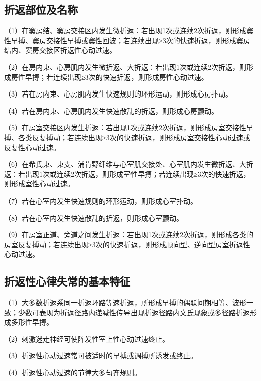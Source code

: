 \protect\hypertarget{text00021.htmlux5cux23subid227}{}{}

\subsection{折返部位及名称}

（1）在窦房结、窦房交接区内发生微折返：若出现1次或连续2次折返，则形成窦性早搏、窦房交接性早搏或窦性回波；若连续出现≥3次的快速折返，则形成窦房结内、窦房交接区折返性心动过速。

（2）在房内束、心房肌内发生微折返、大折返：若出现1次或连续2次折返，则形成房性早搏；若连续出现≥3次的快速折返，则形成房性心动过速。

（3）若在房内束、心房肌内发生快速规则的环形运动，则形成心房扑动。

（4）若在房内束、心房肌内发生快速散乱的折返，则形成心房颤动。

（5）在房室交接区内发生折返：若出现1次或连续2次折返，则形成房室交接性早搏、各类反复搏动；若连续出现≥3次的快速折返，则形成房室交接性心动过速或反复性心动过速。

（6）在希氏束、束支、浦肯野纤维与心室肌交接处、心室肌内发生微折返、大折返：若出现1次或连续2次折返，则形成室性早搏；若连续出现≥3次的快速折返，则形成室性心动过速。

（7）若在心室内发生快速规则的环形运动，则形成心室扑动。

（8）若在心室内发生快速散乱的折返，则形成心室颤动。

（9）在房室正道、旁道之间发生折返：若出现1次或连续2次折返，则形成各类的房室反复搏动；若连续出现≥3次的快速折返，则形成顺向型、逆向型房室折返性心动过速。

\protect\hypertarget{text00021.htmlux5cux23subid228}{}{}

\subsection{折返性心律失常的基本特征}

（1）大多数折返系同一折返环路等速折返，所形成早搏的偶联间期相等、波形一致；少数可表现为折返径路内递减性传导出现折返径路内文氏现象或多径路折返形成多形性早搏。

（2）刺激迷走神经可使阵发性室上性心动过速终止。

（3）折返性心动过速常可被适时的早搏或调搏所诱发或终止。

（4）折返性心动过速的节律大多匀齐规则。

\protect\hypertarget{text00021.htmlux5cux23subid229}{}{}

